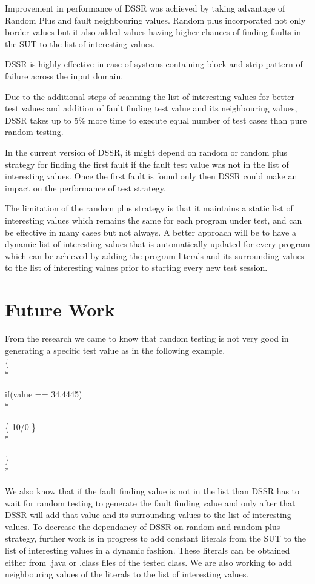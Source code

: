 \documentclass[10pt, conference, compsocconf]{IEEEtran}
\begin{document}
Improvement in performance of DSSR was achieved by taking advantage of Random Plus and fault neighbouring values. Random plus incorporated not only border values but it also added values having higher chances of finding faults in the SUT to the list of interesting values.

DSSR is highly effective in case of systems containing block and strip pattern of failure across the input domain.

Due to the additional steps of scanning the list of interesting values for better test values and addition of fault finding test value and its neighbouring values, DSSR takes up to 5\% more time to execute equal number of test cases than pure random testing.

In the current version of DSSR, it might depend on random or random plus strategy for finding the first fault if the fault test value was not in the list of interesting values. Once the first fault is found only then DSSR could make an impact on the performance of test strategy.

The limitation of the random plus strategy is that it maintains a static list of interesting values which remains the same for each program under test, and can be effective in many cases but not always. A better approach will be to have a dynamic list of interesting values that is automatically updated for every program which can be achieved by adding the program literals and its surrounding values to the list of interesting values prior to starting every new test session.


\section{Future Work}

From the research we came to know that random testing is not very good in generating a specific test value as in the following example.  \\

\{ \\*   

\hspace{07 mm}if(value == 34.4445) \\*

\hspace{07 mm}\{ 10/0 \} \\* 

\} \\*


We also know that if the fault finding value is not in the list than DSSR has to wait for random testing to generate the fault finding value and only after that DSSR will add that value and its surrounding values to the list of interesting values. To decrease the dependancy of DSSR on random and random plus strategy, further work is in progress to add constant literals from the SUT to the list of interesting values in a dynamic fashion. These literals can be obtained either from .java or .class files of the tested class. We are also working to add  neighbouring values of the literals to the list of interesting values. \\
\end{document}
